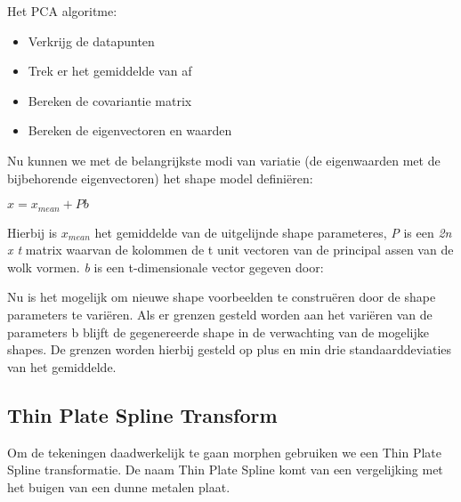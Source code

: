 Het PCA algoritme:
\begin{itemize}
\item Verkrijg de datapunten
\item Trek er het gemiddelde van af
\item Bereken de covariantie matrix
\item Bereken de eigenvectoren en waarden
\end{itemize}

Nu kunnen we met de belangrijkste modi van variatie (de eigenwaarden met de bijbehorende eigenvectoren) het shape model defini\"{e}ren:

$x = x_{mean} + Pb$

Hierbij is $x_{mean}$ het gemiddelde van de uitgelijnde shape parameteres, \textit{P} is een \textit{2n x t} matrix waarvan de kolommen de t unit vectoren van de principal assen van de wolk vormen. \textit{b} is een t-dimensionale vector gegeven door:


Nu is het mogelijk om nieuwe shape voorbeelden te constru\"{e}ren door de shape parameters te vari\"{e}ren. Als er grenzen gesteld worden aan het vari\"{e}ren van de parameters b blijft de gegenereerde shape in de verwachting van de mogelijke shapes. De grenzen worden hierbij gesteld op plus en min drie standaarddeviaties van het gemiddelde.


\subsection{Thin Plate Spline Transform}
Om de tekeningen daadwerkelijk te gaan morphen gebruiken we een Thin Plate Spline transformatie. De naam Thin Plate Spline 
komt van een vergelijking met het buigen van een dunne metalen plaat.\cite{tsp} 